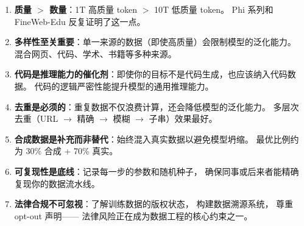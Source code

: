 \begin{corebox}[数据工程的核心原则]
\begin{enumerate}[noitemsep]
  \item \textbf{质量 $>$ 数量}：1T 高质量 token $>$ 10T 低质量 token。
        Phi 系列和 FineWeb-Edu 反复证明了这一点。
  \item \textbf{多样性至关重要}：单一来源的数据（即使高质量）会限制模型的泛化能力。
        混合网页、代码、学术、书籍等多种来源。
  \item \textbf{代码是推理能力的催化剂}：即使你的目标不是代码生成，也应该纳入代码数据。
        代码的逻辑严密性能提升模型的通用推理能力。
  \item \textbf{去重是必须的}：重复数据不仅浪费计算，还会降低模型的泛化能力。
        多层次去重（URL $\to$ 精确 $\to$ 模糊 $\to$ 子串）效果最好。
  \item \textbf{合成数据是补充而非替代}：始终混入真实数据以避免模型坍缩。
        最优比例约为 30\% 合成 + 70\% 真实。
  \item \textbf{可复现性是底线}：记录每一步的参数和随机种子，
        确保同事或后来者能精确复现你的数据流水线。
  \item \textbf{法律合规不可忽视}：了解训练数据的版权状态，
        构建数据溯源系统，
        尊重 opt-out 声明——
        法律风险正在成为数据工程的核心约束之一。
\end{enumerate}
\end{corebox}


